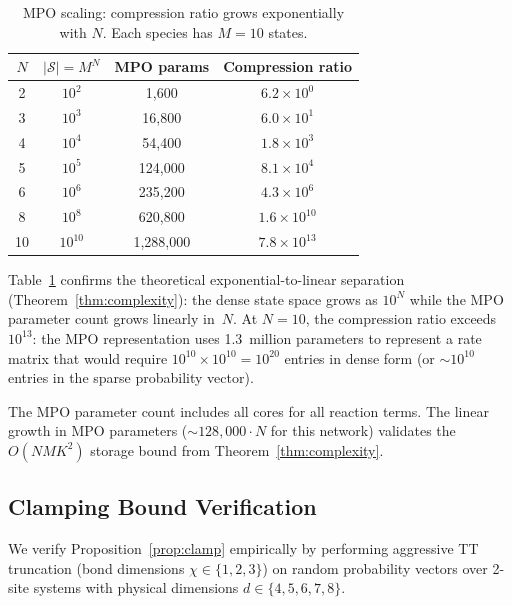 \documentclass[11pt]{article}
\newcommand{\calS}{\mathcal{S}}
\begin{document}
\begin{table}[t]
\centering
\caption{MPO scaling: compression ratio grows exponentially with $N$.
  Each species has $M=10$ states.}
\label{tab:scaling}
\begin{tabular}{cccc}
\toprule
$N$ & $|\calS| = M^N$ & \textbf{MPO params} & \textbf{Compression ratio} \\
\midrule
2  & $10^{2}$   & 1{,}600     & $6.2\times 10^{0}$ \\
3  & $10^{3}$   & 16{,}800    & $6.0\times 10^{1}$ \\
4  & $10^{4}$   & 54{,}400    & $1.8\times 10^{3}$ \\
5  & $10^{5}$   & 124{,}000   & $8.1\times 10^{4}$ \\
6  & $10^{6}$   & 235{,}200   & $4.3\times 10^{6}$ \\
8  & $10^{8}$   & 620{,}800   & $1.6\times 10^{10}$ \\
10 & $10^{10}$  & 1{,}288{,}000 & $7.8\times 10^{13}$ \\
\bottomrule
\end{tabular}
\end{table}

Table~\ref{tab:scaling} confirms the theoretical
exponential-to-linear separation
(Theorem~\ref{thm:complexity}): the dense state space grows as
$10^N$ while the MPO parameter count grows linearly in~$N$.
At $N=10$, the compression ratio exceeds $10^{13}$: the MPO
representation uses 1.3~million parameters to represent a rate matrix
that would require $10^{10} \times 10^{10} = 10^{20}$ entries in dense
form (or $\sim\!10^{10}$ entries in the sparse probability vector).

The MPO parameter count includes all cores for all reaction terms.
The linear growth in MPO parameters ($\sim\!128{,}000 \cdot N$ for
this network) validates the $O(NMK^2)$ storage bound from
Theorem~\ref{thm:complexity}.

\subsection{Clamping Bound Verification}\label{sec:exp:clamp}

We verify Proposition~\ref{prop:clamp} empirically by performing
aggressive TT truncation (bond dimensions $\chi \in \{1,2,3\}$)
on random probability vectors over 2-site systems with physical
dimensions $d \in \{4,5,6,7,8\}$.
\end{document}

